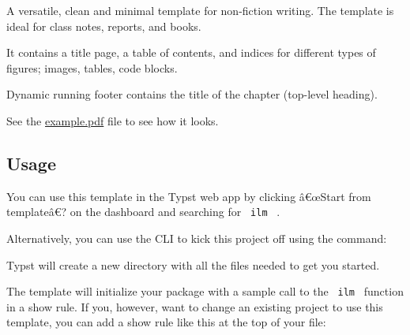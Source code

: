 A versatile, clean and minimal template for non-fiction writing. The
template is ideal for class notes, reports, and books.

It contains a title page, a table of contents, and indices for different
types of figures; images, tables, code blocks.

Dynamic running footer contains the title of the chapter (top-level
heading).

See the
\href{https://github.com/talal/ilm/blob/main/example.pdf}{example.pdf}
file to see how it looks.

\subsection{Usage}\label{usage}

You can use this template in the Typst web app by clicking â€œStart from
templateâ€? on the dashboard and searching for \texttt{\ ilm\ } .

Alternatively, you can use the CLI to kick this project off using the
command:

\begin{Shaded}
\begin{Highlighting}[]
\end{Highlighting}
\end{Shaded}

Typst will create a new directory with all the files needed to get you
started.

The template will initialize your package with a sample call to the
\texttt{\ ilm\ } function in a show rule. If you, however, want to
change an existing project to use this template, you can add a show rule
like this at the top of your file:

\begin{Shaded}
\begin{Highlighting}[]


\NormalTok{)}

\end{Highlighting}
\end{Shaded}

